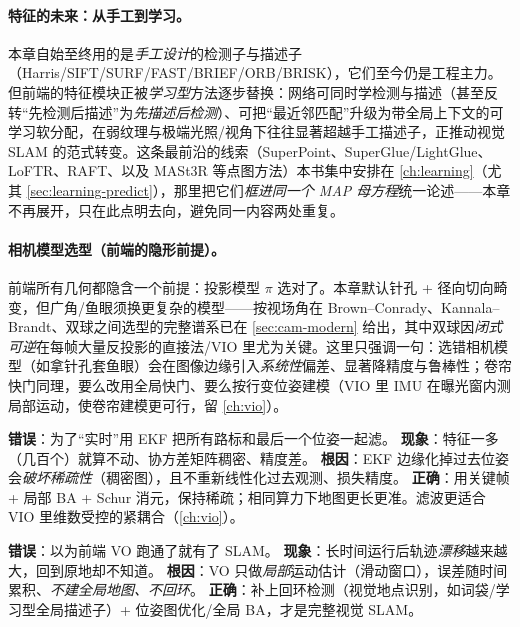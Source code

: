 \paragraph{特征的未来：从手工到学习。}本章自始至终用的是\emph{手工设计}的检测子与描述子（Harris/SIFT/SURF/FAST/BRIEF/ORB/BRISK），它们至今仍是工程主力。但前端的特征模块正被\emph{学习型}方法逐步替换：网络可同时学检测与描述（甚至反转“先检测后描述”为\emph{先描述后检测}）、可把“最近邻匹配”升级为带全局上下文的可学习软分配，在弱纹理与极端光照/视角下往往显著超越手工描述子，正推动视觉 SLAM 的范式转变。这条最前沿的线索（SuperPoint、SuperGlue/LightGlue、LoFTR、RAFT、以及 MASt3R 等点图方法）本书集中安排在 \cref{ch:learning}（尤其 \cref{sec:learning-predict}），那里把它们\emph{框进同一个 MAP 母方程}统一论述——本章不再展开，只在此点明去向，避免同一内容两处重复。

\paragraph{相机模型选型（前端的隐形前提）。}前端所有几何都隐含一个前提：投影模型 $\pi$ 选对了。本章默认针孔 + 径向切向畸变，但广角/鱼眼须换更复杂的模型——按视场角在 Brown--Conrady、Kannala--Brandt、双球之间选型的完整谱系已在 \cref{sec:cam-modern} 给出，其中双球因\emph{闭式可逆}在每帧大量反投影的直接法/VIO 里尤为关键。这里只强调一句\cite{carlone2026handbook}：选错相机模型（如拿针孔套鱼眼）会在图像边缘引入\emph{系统性}偏差、显著降精度与鲁棒性；卷帘快门同理，要么改用全局快门、要么按行变位姿建模（VIO 里 IMU 在曝光窗内测局部运动，使卷帘建模更可行，留 \cref{ch:vio}）。

\begin{pitfall}
\textbf{错误}：为了“实时”用 EKF 把所有路标和最后一个位姿一起滤。
\textbf{现象}：特征一多（几百个）就算不动、协方差矩阵稠密、精度差。
\textbf{根因}：EKF 边缘化掉过去位姿会\emph{破坏稀疏性}（稠密图），且不重新线性化过去观测、损失精度\cite{carlone2026handbook}。
\textbf{正确}：用关键帧 + 局部 BA + Schur 消元，保持稀疏；相同算力下地图更长更准。滤波更适合 VIO 里维数受控的紧耦合（\cref{ch:vio}）。
\end{pitfall}

\begin{pitfall}
\textbf{错误}：以为前端 VO 跑通了就有了 SLAM。
\textbf{现象}：长时间运行后轨迹\emph{漂移}越来越大，回到原地却不知道。
\textbf{根因}：VO 只做\emph{局部}运动估计（滑动窗口），误差随时间累积、\emph{不建全局地图、不回环}\cite{carlone2026handbook}。
\textbf{正确}：补上回环检测（视觉地点识别，如词袋/学习型全局描述子）+ 位姿图优化/全局 BA，才是完整视觉 SLAM。
\end{pitfall}

